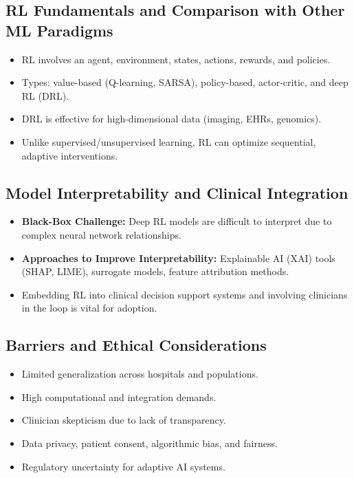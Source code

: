 \subsection*{RL Fundamentals and Comparison with Other ML Paradigms}
\begin{itemize}
    \item RL involves an agent, environment, states, actions, rewards, and policies.
    \item Types: value-based (Q-learning, SARSA), policy-based, actor-critic, and deep RL (DRL).
    \item DRL is effective for high-dimensional data (imaging, EHRs, genomics).
    \item Unlike supervised/unsupervised learning, RL can optimize sequential, adaptive interventions.
\end{itemize}

\subsection*{Model Interpretability and Clinical Integration}
\begin{itemize}
    \item \textbf{Black-Box Challenge:} Deep RL models are difficult to interpret due to complex neural network relationships.
    \item \textbf{Approaches to Improve Interpretability:} Explainable AI (XAI) tools (SHAP, LIME), surrogate models, feature attribution methods.
    \item Embedding RL into clinical decision support systems and involving clinicians in the loop is vital for adoption.
\end{itemize}

\subsection*{Barriers and Ethical Considerations}
\begin{itemize}
    \item Limited generalization across hospitals and populations.
    \item High computational and integration demands.
    \item Clinician skepticism due to lack of transparency.
    \item Data privacy, patient consent, algorithmic bias, and fairness.
    \item Regulatory uncertainty for adaptive AI systems.
\end{itemize}

